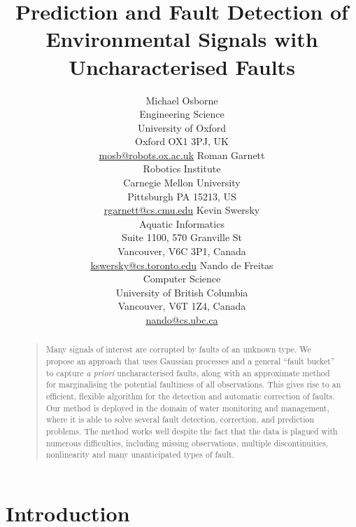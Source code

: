 \documentclass[letterpaper]{article}
\begin{document}
\title{Prediction and Fault Detection of Environmental Signals with Uncharacterised Faults}

\author{ Michael Osborne\\
Engineering Science\\
University of Oxford\\
Oxford OX1 3PJ, UK\\
\url{mosb@robots.ox.ac.uk}
 \And Roman Garnett\\
Robotics Institute\\
Carnegie Mellon University\\
Pittsburgh PA 15213, US\\
\url{rgarnett@cs.cmu.edu}
 \And Kevin Swersky\\
Aquatic Informatics\\
Suite 1100, 570 Granville St\\
Vancouver, V6C 3P1, Canada\\
\url{kswersky@cs.toronto.edu}
 \And Nando de Freitas\\
Computer Science \\
University of British Columbia\\
Vancouver, V6T 1Z4, Canada\\
\url{nando@cs.ubc.ca}
}

\maketitle

\begin{abstract}
\begin{quote}
 Many signals of interest are corrupted by faults of an unknown
type. We propose an approach that uses Gaussian processes and a
general ``fault bucket'' to capture \textit{a priori} uncharacterised
faults, along with an approximate method for marginalising the
potential faultiness of all observations. This gives rise to an
efficient, flexible algorithm for the detection and automatic
correction of faults. Our method is deployed in the domain of water
monitoring and management, where it is able to solve several fault
detection, correction, and prediction problems. The method works well
despite the fact that the data is plagued with numerous difficulties,
including missing observations, multiple discontinuities, nonlinearity and many unanticipated types of fault.
\end{quote}
\end{abstract}

\section{Introduction}
\end{document}
